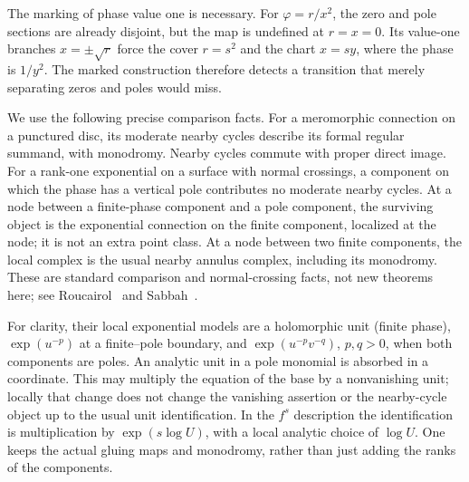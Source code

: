 \documentclass[11pt]{article}
\theoremstyle{definition}\newtheorem{definition}[theorem]{Definition}
\theoremstyle{remark}\newtheorem{remark}[theorem]{Remark}
\begin{document}
The marking of phase value one is necessary. For $\varphi=r/x^2$,
the zero and pole sections are already disjoint, but the map is
undefined at $r=x=0$. Its value-one branches $x=\pm\sqrt r$
force the cover $r=s^2$ and the chart $x=sy$, where the phase is
$1/y^2$. The marked construction therefore detects a transition
that merely separating zeros and poles would miss.


We use the following precise comparison facts. For a meromorphic
connection on a punctured disc, its moderate nearby cycles describe
its formal regular summand, with monodromy. Nearby cycles commute
with proper direct image. For a rank-one exponential on a surface
with normal crossings, a component on which the phase has a vertical
pole contributes no moderate nearby cycles. At a node between a
finite-phase component and a pole component, the surviving object is
the exponential connection on the finite component, localized at the
node; it is not an extra point class. At a node between two finite
components, the local complex is the usual nearby annulus complex,
including its monodromy. These are standard comparison and
normal-crossing facts, not new theorems here; see
Roucairol~\cite[Section~1.2 and Lemma~1.4]{RoucairolFormal} and
Sabbah~\cite[Section~1.b, especially Proposition~1.5]{SabbahStationary}.

For clarity, their local exponential models are a holomorphic unit
(finite phase), $\exp(u^{-p})$ at a finite--pole boundary, and
$\exp(u^{-p}v^{-q})$, $p,q>0$, when both components are poles.
An analytic unit in a pole monomial is absorbed in a coordinate.
This may multiply the equation of the base by a nonvanishing unit;
locally that change does not change the vanishing assertion or the
nearby-cycle object up to the usual unit identification. In the
$f^s$ description the identification is multiplication by
$\exp(s\log U)$, with a local analytic choice of $\log U$.
One keeps the actual gluing maps and monodromy, rather than just
adding the ranks of the components.
\end{document}
